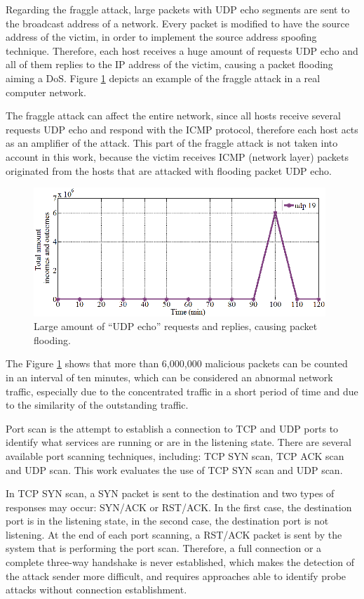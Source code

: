 Regarding the fraggle attack, large packets with UDP echo segments are sent to the broadcast address of a network. Every packet is modified to have the source address of the victim, in order to implement the source address spoofing technique. Therefore, each host receives a huge amount of requests UDP echo and all of them replies to the IP address of the victim, causing a packet flooding aiming a DoS. Figure \ref{fig:2.06} depicts an example of the fraggle attack in a real computer network. 

The fraggle attack can affect the entire network, since all hosts receive several requests UDP echo and respond with the ICMP protocol, therefore each host acts as an amplifier of the attack. This part of the fraggle attack is not taken into account in this work, because the victim receives ICMP (network layer) packets originated from the hosts that are attacked with flooding packet UDP echo.

\begin{figure}[h!]
     \centering 
     \includegraphics[width=11cm]{figures/ch2/fig06.png}
     \caption{Large amount of “UDP echo” requests and replies, causing packet flooding.}
     \label{fig:2.06}
\end{figure}

The Figure \ref{fig:2.06} shows that more than 6,000,000 malicious packets can be counted in an interval of ten minutes, which can be considered an abnormal network traffic, especially due to the concentrated traffic in a short period of time and due to the similarity of the outstanding traffic.

Port scan is the attempt to establish a connection to TCP and UDP ports to identify what services are running or are in the listening state. There are several available port scanning techniques, including: TCP SYN scan, TCP ACK scan and UDP scan. This work evaluates the use of TCP SYN scan and UDP scan. 

In TCP SYN scan, a SYN packet is sent to the destination and two types of responses may occur: SYN/ACK or RST/ACK. In the first case, the destination port is in the listening state, in the second case, the destination port is not listening. At the end of each port scanning, a RST/ACK packet is sent by the system that is performing the port scan. Therefore, a full connection or a complete three-way handshake is never established, which makes the detection of the attack sender more difficult, and requires approaches able to identify probe attacks without connection establishment.

